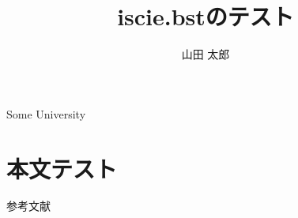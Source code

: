 \documentclass[J,amsmath]{scitrans}
\begin{document}
  \title{iscie.bstのテスト}
  \author{山田 太郎}

  \address{*}{\AcceptDate}
  \address{**}{Some University}

  \section*{本文テスト}
    参考文献\cite{azuma2008optimal,東俊一2007離散値入力型制御のための最適動的量子化器の安定性,永原正章2017-10-06,azuma2008stability}
\end{document}
